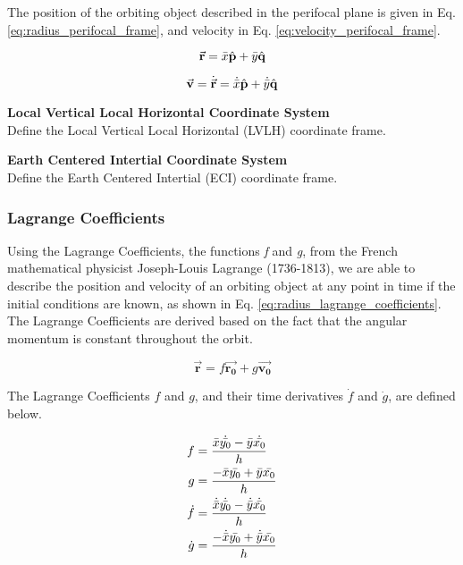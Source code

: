 The position of the orbiting object described in the perifocal plane is given in Eq. \ref{eq:radius_perifocal_frame}, and velocity in Eq. \ref{eq:velocity_perifocal_frame}.

\begin{equation}
    \Vec{\mathbf{r}} = \Bar{x}\hat{\mathbf{p}} + \Bar{y}\hat{\mathbf{q}}
    \label{eq:radius_perifocal_frame}
\end{equation}

\begin{equation}
    \Vec{\mathbf{v}} = \dot{\Vec{\mathbf{r}}} = \dot{\Bar{x}}\hat{\mathbf{p}} + \dot{\Bar{y}}\hat{\mathbf{q}}
    \label{eq:velocity_perifocal_frame}
\end{equation}


\textbf{Local Vertical Local Horizontal Coordinate System} \\

Define the Local Vertical Local Horizontal (LVLH) coordinate frame. \\  

\textbf{Earth Centered Intertial Coordinate System} \\

Define the Earth Centered Intertial (ECI) coordinate frame. \\


\subsubsection{Lagrange Coefficients}

Using the Lagrange Coefficients, the functions \textit{f} and \textit{g}, from the French mathematical physicist Joseph-Louis Lagrange (1736-1813), we are able to describe the position and velocity of an orbiting object at any point in time if the initial conditions are known, as shown in Eq. \ref{eq:radius_lagrange_coefficients}. The Lagrange Coefficients are derived based on the fact that the angular momentum is constant throughout the orbit.   


\begin{equation}
    \Vec{\mathbf{r}} = f \Vec{\mathbf{r_0}} + g \Vec{\mathbf{v_0}}
    \label{eq:radius_lagrange_coefficients}
\end{equation}

The Lagrange Coefficients $f$ and $g$, and their time derivatives $\dot{f}$ and $\dot{g}$, are defined below.

\begin{align}
    f &= \frac{ \Bar{x} \dot{\Bar{y_0}} - \Bar{y} \dot{\Bar{x_0}} }{ h }
    \label{eq:lagrange_f} \\
    g &= \frac{ - \Bar{x} \Bar{y_0} + \Bar{y} \Bar{x_0} }{ h } 
    \label{eq:lagrange_g} \\
    \dot{f} &= \frac{ \dot{\Bar{x}} \dot{\Bar{y_0}} - \dot{\Bar{y}} \dot{\Bar{x_0}} }{ h } 
    \label{eq:lagrange_f_dot} \\
    \dot{g} &= \frac{ - \dot{\Bar{x}} \Bar{y_0} + \dot{\Bar{y}} \Bar{x_0} }{ h } 
    \label{eq:lagrange_g_dot}
\end{align}

